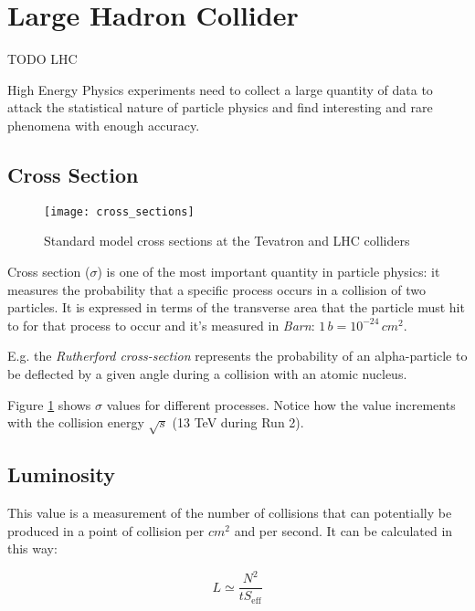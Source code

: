 \section{Large Hadron Collider}


TODO LHC

High Energy Physics experiments need to collect a large quantity of data to attack the statistical nature of particle physics and find interesting and rare phenomena with enough accuracy.

\subsection{Cross Section}

\begin{figure}

	\centerline{
		\texttt{[image: cross\_sections]}}
	\caption{Standard  model  cross  sections  at  the  Tevatron  and  LHC  colliders\cite{Bechtel:2009zza}}
	\label{fig:cross_sections}
\end{figure}

Cross section ($\sigma$) is one of the most important quantity in particle physics: it measures the probability that a specific process occurs in a collision of two particles. It is expressed in terms of the transverse area that the particle must hit to for that process to occur and it's measured in \textit{Barn}: $1\, b = 10^{-24} \,cm^2$.

E.g. the \textit{Rutherford cross-section} represents the probability of an alpha-particle to be deflected by a given angle during a collision with an atomic nucleus.


Figure \ref{fig:cross_sections} shows $\sigma$ values for different processes. Notice how the value increments with the collision energy $\sqrt s$ (13 TeV during Run 2).

\subsection{Luminosity}

This value is a measurement of the number of collisions that can potentially be produced in a point of collision per $cm^2$ and per second. It can be calculated in this way:

\begin{equation}
	L \simeq  \frac{N^2}{t S_{\text{eff}}}
\end{equation}

